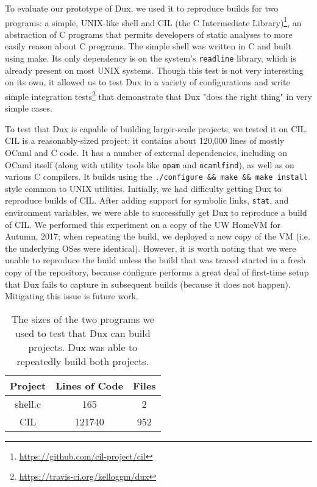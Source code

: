 \documentclass[10pt,conference]{IEEEtran}
\begin{document}
To evaluate our prototype of Dux, we used it to reproduce builds for two programs: a simple, UNIX-like shell and
CIL (the C Intermediate Library)\footnote{\url{https://github.com/cil-project/cil}}, an abstraction of C programs
that permits developers of static analyses to more easily reason about C programs. The simple shell was written in
C and built using make. Its only dependency is on the system's \texttt{readline} library, which is already
present on most UNIX systems. Though this test is not very interesting on its own, it allowed us to test Dux in
a variety of configurations and write simple integration tests\footnote{\url{https://travis-ci.org/kelloggm/dux}}
that demonstrate that Dux "does the right thing" in very simple cases.

To test that Dux is capable of building larger-scale projects, we tested it on CIL. CIL is a reasonably-sized
project: it contains about 120,000 lines of mostly OCaml and C code. It has a number of external dependencies,
including on OCaml itself (along with utility tools like \texttt{opam} and \texttt{ocamlfind}), as well as on
various C compilers. It builds using the \texttt{./configure \&\& make \&\& make install} style common to UNIX
utilities. Initially, we had difficulty getting Dux to reproduce builds of CIL. After adding support for symbolic
links, \texttt{stat}, and environment variables, we were able to successfully get Dux to reproduce a build of CIL.
We performed this experiment on a copy of the UW HomeVM for Autumn, 2017; when repeating the build, we deployed
a new copy of the VM (i.e. the underlying OSes were identical). However, it is worth noting that we were unable
to reproduce the build unless the build that was traced started in a fresh copy of the repository, because
configure performs a great deal of first-time setup that Dux fails to capture in subsequent builds (because it
does not happen). Mitigating this issue is future work.

\begin{table}
\begin{center}
\begin{tabular}{ |c|c|c| }
 \hline
 Project & Lines of Code & Files \\ \hline \hline
 shell.c & 165 & 2 \\ \hline
 CIL & 121740 & 952 \\
 \hline
\end{tabular}
\caption{The sizes of the two programs we used to test that Dux can build projects. Dux was able to repeatedly
build both projects.}
\end{center}
\end{table}
\end{document}
